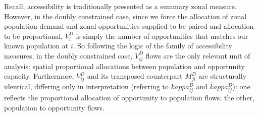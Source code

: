 \documentclass[
  10pt,
  letterpaper,
]{article}
\begin{document}
\begin{table}

\caption{\label{tbl-adjusted-small-system-land-use-doubly-constrained-case-allfs-access-values-for-zone2}Doubly
constrained accessible opportunities at Zone 2 for all travel decay
groups in the modified simple system.}


\end{table}%

Recall, accessibility is traditionally presented as a summary zonal
measure. However, in the doubly constrained case, since we force the
allocation of zonal population demand and zonal opportunities supplied
to be paired and allocation to be proportional, \(V_i^D\) is simply the
number of opportunities that matches our known population at \(i\). So
following the logic of the family of accessibility measures, in the
doubly constrained case, \(V_{ij}^D\) flows are the only relevant unit
of analysis: spatial proportional allocations between population and
opportunity capacity. Furthermore, \(V^D_{ij}\) and its transposed
counterpart \(M^D_{ji}\) are structurally identical, differing only in
interpretation (referring to \(kappa_{ij}^D\) and
\(\hat kappa_{ij}^D\)): one reflects the proportional allocation of
opportunity to population flows; the other, population to opportunity
flows.
\end{document}
